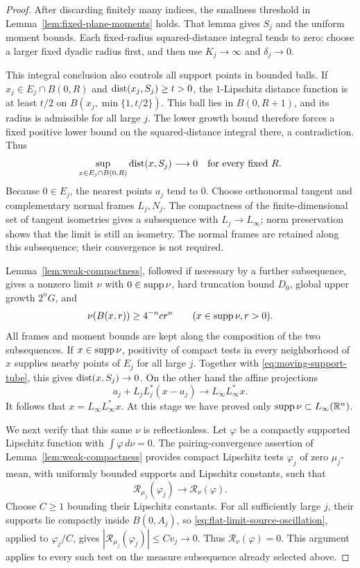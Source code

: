 \begin{proof}
After discarding finitely many indices, the smallness threshold in
Lemma~\ref{lem:fixed-plane-moments} holds.  That lemma gives $S_j$ and the
uniform moment bounds.  Each fixed-radius squared-distance integral tends
to zero: choose a larger fixed dyadic radius first, and then use
$K_j\to\infty$ and $\delta_j\to0$.

This integral conclusion also controls all support points in bounded
balls.  If $x_j\in E_j\cap B(0,R)$ and $\operatorname{dist}(x_j,S_j)\ge t>0$, the
$1$-Lipschitz distance function is at least $t/2$ on
$B(x_j,\min\{1,t/2\})$.  This ball lies in $B(0,R+1)$, and its radius
is admissible for all large $j$.  The lower growth bound therefore forces
a fixed positive lower bound on the squared-distance integral there,
a contradiction.  Thus
\begin{equation}\label{eq:moving-support-tube}
 \sup_{x\in E_j\cap B(0,R)}\operatorname{dist}(x,S_j)\longrightarrow0
 \quad\text{for every fixed }R.
\end{equation}
Because $0\in E_j$, the nearest points $a_j$ tend to $0$.
Choose orthonormal tangent and complementary normal frames $L_j,N_j$.
The compactness of the finite-dimensional set of tangent isometries gives
a subsequence with $L_j\to L_\infty$; norm preservation shows that the
limit is still an isometry.  The normal frames are retained along this
subsequence; their convergence is not required.

Lemma~\ref{lem:weak-compactness}, followed if necessary by a further
subsequence, gives a nonzero limit $\nu$ with $0\in\operatorname{supp}\nu$, hard
truncation bound $D_0$, global upper growth $2^nG$, and
\begin{equation}\label{eq:flat-limit-lower-growth}
 \nu(B(x,r))\ge4^{-n}cr^n
 \qquad(x\in\operatorname{supp}\nu, r>0).
\end{equation}
All frames and moment bounds are kept along the composition of the two
subsequences.  If $x\in\operatorname{supp}\nu$, positivity of compact tests in every
neighborhood of $x$ supplies nearby points of $E_j$ for all large $j$.
Together with \eqref{eq:moving-support-tube}, this gives
$\operatorname{dist}(x,S_j)\to0$.  On the other hand the affine projections
\[
 a_j+L_jL_j^*(x-a_j)\longrightarrow L_\infty L_\infty^*x.
\]
It follows that $x=L_\infty L_\infty^*x$.  At this stage we have proved
only $\operatorname{supp}\nu\subset L_\infty(\mathbb R^n)$.

We next verify that this same $\nu$ is reflectionless. Let $\varphi$ be a
compactly supported Lipschitz function with $\int\varphi\,d\nu=0$.
The pairing-convergence assertion of Lemma~\ref{lem:weak-compactness}
provides compact Lipschitz tests $\varphi_j$ of zero $\mu_j$-mean,
with uniformly bounded supports and Lipschitz constants, such that
\[
 \mathcal R_{\mu_j}(\varphi_j)\longrightarrow
 \mathcal R_\nu(\varphi).
\]
Choose $C\ge1$ bounding their Lipschitz constants. For all sufficiently
large $j$, their supports lie compactly inside $B(0,A_j)$, so
\eqref{eq:flat-limit-source-oscillation}, applied to $\varphi_j/C$,
gives $|\mathcal R_{\mu_j}(\varphi_j)|\le Cv_j\to0$.
Thus $\mathcal R_\nu(\varphi)=0$. This argument applies to every such
test on the measure subsequence already selected above.


\end{proof}
